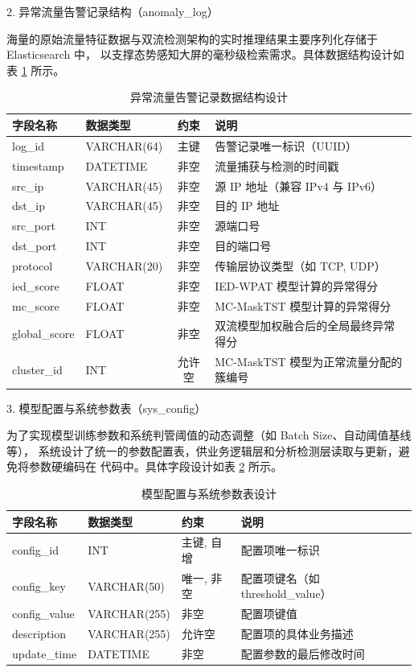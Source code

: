 2. 异常流量告警记录结构（anomaly\_log）

海量的原始流量特征数据与双流检测架构的实时推理结果主要序列化存储于 Elasticsearch 中，
以支撑态势感知大屏的毫秒级检索需求。具体数据结构设计如表 \ref{tab:anomaly_log} 所示。

\begin{table}[htbp]
    \centering
    \caption{异常流量告警记录数据结构设计}
    \label{tab:anomaly_log}
    \begin{tabular}{l l c p{7.5cm}}
        \toprule
        字段名称 & 数据类型 & 约束 & 说明 \\
        \midrule
        log\_id & VARCHAR(64) & 主键 & 告警记录唯一标识（UUID） \\
        timestamp & DATETIME & 非空 & 流量捕获与检测的时间戳 \\
        src\_ip & VARCHAR(45) & 非空 & 源 IP 地址（兼容 IPv4 与 IPv6） \\
        dst\_ip & VARCHAR(45) & 非空 & 目的 IP 地址 \\
        src\_port & INT & 非空 & 源端口号 \\
        dst\_port & INT & 非空 & 目的端口号 \\
        protocol & VARCHAR(20) & 非空 & 传输层协议类型（如 TCP, UDP） \\
        ied\_score & FLOAT & 非空 & IED-WPAT 模型计算的异常得分 \\
        mc\_score & FLOAT & 非空 & MC-MaskTST 模型计算的异常得分 \\
        global\_score & FLOAT & 非空 & 双流模型加权融合后的全局最终异常得分 \\
        cluster\_id & INT & 允许空 & MC-MaskTST 模型为正常流量分配的簇编号 \\
        \bottomrule
    \end{tabular}
\end{table}

3. 模型配置与系统参数表（sys\_config）

为了实现模型训练参数和系统判管阈值的动态调整（如 Batch Size、自动阈值基线等），
系统设计了统一的参数配置表，供业务逻辑层和分析检测层读取与更新，避免将参数硬编码在
代码中。具体字段设计如表 \ref{tab:sys_config} 所示。

\begin{table}[htbp]
\centering
\caption{模型配置与系统参数表设计}
\label{tab:sys_config}
\begin{tabular}{p{2.5cm} p{3cm} p{2cm} p{6cm}}
\toprule
字段名称 & 数据类型 & 约束 & 说明 \\
\midrule
config\_id & INT & 主键, 自增 & 配置项唯一标识 \\
config\_key & VARCHAR(50) & 唯一, 非空 & 配置项键名（如 threshold\_value） \\
config\_value & VARCHAR(255) & 非空 & 配置项键值 \\
description & VARCHAR(255) & 允许空 & 配置项的具体业务描述 \\
update\_time & DATETIME & 非空 & 配置参数的最后修改时间 \\
\bottomrule
\end{tabular}
\end{table}

